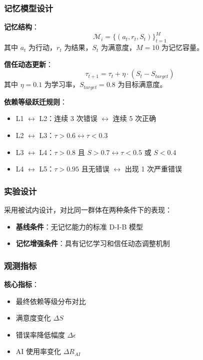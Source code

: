 \documentclass[a4paper,12pt]{article}
\begin{document}
\subsubsection{记忆模型设计}

\textbf{记忆结构}：
\begin{equation}
    \mathcal{M}_i = \{(a_t, r_t, S_t)\}_{t=1}^{M}
\end{equation}
其中 $a_t$ 为行动，$r_t$ 为结果，$S_t$ 为满意度，$M=10$ 为记忆容量。

\textbf{信任动态更新}：
\begin{equation}
    \tau_{t+1} = \tau_t + \eta \cdot (S_t - S_{target})
\end{equation}
其中 $\eta=0.1$ 为学习率，$S_{target}=0.8$ 为目标满意度。

\textbf{依赖等级跃迁规则}：
\begin{itemize}
    \item L1 $\leftrightarrow$ L2：连续 3 次错误 $\leftrightarrow$ 连续 5 次正确
    \item L2 $\leftrightarrow$ L3：$\tau > 0.6 \leftrightarrow \tau < 0.3$
    \item L3 $\leftrightarrow$ L4：$\tau > 0.8$ 且 $S > 0.7 \leftrightarrow \tau < 0.5$ 或 $S < 0.4$
    \item L4 $\leftrightarrow$ L5：$\tau > 0.95$ 且无错误 $\leftrightarrow$ 出现 1 次严重错误
\end{itemize}

\subsubsection{实验设计}

采用被试内设计，对比同一群体在两种条件下的表现：
\begin{itemize}
    \item \textbf{基线条件}：无记忆能力的标准 D-I-B 模型
    \item \textbf{记忆增强条件}：具有记忆学习和信任动态调整机制
\end{itemize}

\subsubsection{观测指标}

\textbf{核心指标}：
\begin{itemize}
    \item 最终依赖等级分布对比
    \item 满意度变化 $\Delta S$
    \item 错误率降低幅度 $\Delta \epsilon$
    \item AI 使用率变化 $\Delta R_{AI}$
\end{itemize}
\end{document}
